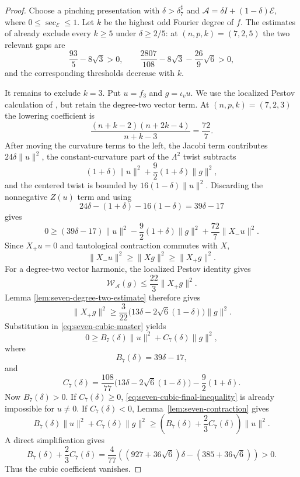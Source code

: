 \documentclass[reqno,11pt]{amsart}
\theoremstyle{definition}
\newcommand{\cA}{\mathcal A}
\newcommand{\cE}{\mathcal E}
\begin{document}
\begin{proof}
Choose a pinching presentation with
$\delta>\delta_7^\sharp$ and
$\cA=\delta I+(1-\delta)\cE$, where
$0\leq\sec_{\cE}\leq1$.  Let $k$ be the highest odd Fourier degree of
$f$.  The estimates of \cite[Proposition~4.4 and Lemma~4.11]{CLMS24}
already exclude every $k\geq5$ under $\delta\geq2/5$: at
$(n,p,k)=(7,2,5)$ the two relevant gaps are
$$
  \frac{93}{5}-8\sqrt3>0,
  \qquad
  \frac{2807}{108}-8\sqrt3-\frac{26}{9}\sqrt6>0,
$$
and the corresponding thresholds decrease with $k$.

It remains to exclude $k=3$.  Put $u=f_3$ and $g=\iota_vu$.  We use the
localized Pestov calculation of \cite[Proposition~4.4]{CLMS24}, but retain
the degree-two vector term.  At $(n,p,k)=(7,2,3)$ the lowering coefficient
is
$$
 \frac{(n+k-2)(n+2k-4)}{n+k-3}=\frac{72}{7}.
$$
After moving the curvature terms to the left, the Jacobi term contributes
$24\delta\|u\|^2$, the constant-curvature part of the $\Lambda^2$ twist
subtracts
$$
 (1+\delta)\|u\|^2+\frac92(1+\delta)\|g\|^2,
$$
and the centered twist is bounded by $16(1-\delta)\|u\|^2$.  Discarding
the nonnegative $Z(u)$ term and using
$$
 24\delta-(1+\delta)-16(1-\delta)=39\delta-17
$$
gives
\begin{equation}\label{eq:seven-cubic-master}
 0\geq(39\delta-17)\|u\|^2
 -\frac92(1+\delta)\|g\|^2
 +\frac{72}{7}\|X_-u\|^2.
\end{equation}
Since $X_+u=0$ and tautological contraction commutes with $X$,
$$
  \|X_-u\|^2\geq\|Xg\|^2\geq\|X_+g\|^2.
$$
For a degree-two vector harmonic, the localized Pestov identity gives
$$
  \mathcal W_{\cA}(g)\leq\frac{22}{3}\|X_+g\|^2.
$$
Lemma
\ref{lem:seven-degree-two-estimate} therefore gives
$$
  \|X_+g\|^2
  \geq\frac3{22}
  \bigl(13\delta-2\sqrt6(1-\delta)\bigr)\|g\|^2.
$$
Substitution in \eqref{eq:seven-cubic-master} yields
\begin{equation}\label{eq:seven-cubic-final-inequality}
  0\geq B_7(\delta)\|u\|^2+C_7(\delta)\|g\|^2,
\end{equation}
where
$$
  B_7(\delta)=39\delta-17,
$$
and
$$
  C_7(\delta)
  =\frac{108}{77}
    \bigl(13\delta-2\sqrt6(1-\delta)\bigr)
   -\frac92(1+\delta).
$$
Now $B_7(\delta)>0$.  If $C_7(\delta)\geq0$,
\eqref{eq:seven-cubic-final-inequality} is already impossible for $u\neq0$.
If $C_7(\delta)<0$, Lemma~\ref{lem:seven-contraction} gives
$$
  B_7(\delta)\|u\|^2+C_7(\delta)\|g\|^2
  \geq
  \left(B_7(\delta)+\frac23C_7(\delta)\right)\|u\|^2.
$$
A direct simplification gives
\begin{equation*}
  B_7(\delta)+\frac23C_7(\delta)
  =\frac4{77}
   \left((927+36\sqrt6)\delta-(385+36\sqrt6)\right)>0.
\end{equation*}
Thus the cubic coefficient vanishes.


\end{proof}
\end{document}
